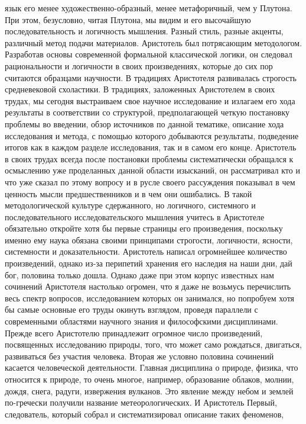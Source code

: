 язык его менее художественно-образный, менее метафоричный, чем у Плутона. При
этом, безусловно, читая Плутона, мы видим и его высочайшую последовательность и
логичность мышления. Разный стиль, разные акценты, различный метод подачи
материалов. Аристотель был потрясающим методологом. Разработав основы
современной формальной классической логики, он следовал рациональности и
логичности в своих произведениях, которые до сих пор считаются образцами
научности. В традициях Аристотеля развивалась строгость средневековой
схоластики. В традициях, заложенных Аристотелем в своих трудах, мы сегодня
выстраиваем свое научное исследование и излагаем его хода результаты в
соответствии со структурой, предполагающей четкую постановку проблемы во
введении, обзор источников по данной тематике, описание хода исследования и
метода, с помощью которого добываются результаты, подведение итогов как в каждом
разделе исследования, так и в самом его конце. Аристотель в своих трудах всегда
после постановки проблемы систематически обращался к осмыслению уже проделанных
данной области изысканий, он рассматривал кто и что уже сказал по этому вопросу
и в русле своего рассуждения показывал в чем ценность мысли предшественников и в
чем они ошибались. В такой методологической культуре сдержанного, но логичного,
системного и последовательного исследовательского мышления учитесь в Аристотеле
обязательно откройте хотя бы первые страницы его произведения, поскольку именно
ему наука обязана своими принципами строгости, логичности, ясности, системности
и доказательности. Аристотель написал огромнейшее количество произведений,
однако из-за перипетий хранения его наследия на наши дни, дай бог, половина
только дошла. Однако даже при этом корпус известных нам сочинений Аристотеля
настолько огромен, что я даже не возьмусь перечислить весь спектр вопросов,
исследованием которых он занимался, но попробуем хотя бы самые основные его
труды окинуть взглядом, проведя параллели с современными областями научного
знания и философскими дисциплинами. Прежде всего Аристотелю принадлежит огромное
число произведений, посвященных исследованию природы, того, что может само
рождаться, двигаться, развиваться без участия человека. Вторая же условно
половина сочинений касается человеческой деятельности. Главная дисциплина о
природе, физика, что относится к природе, то очень многое, например, образование
облаков, молнии, дождя, снега, радуги, извержения вулканов. Это явление между
небом и землей по-гречески получили название метеорологических. И Аристотель
Первый, следователь, который собрал и систематизировал описание таких феноменов,
